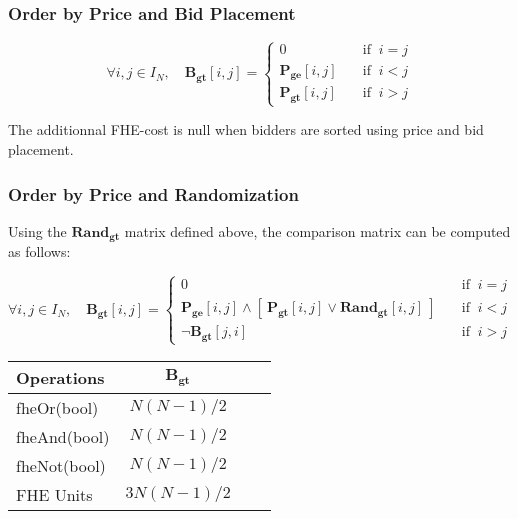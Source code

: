 \subsubsection{Order by Price and Bid Placement}

\begin{equation*}
    \forall i,j \in I_N, \quad \mathbf{B_{gt}}[i, j] = 
    \begin{cases}
        0  \quad &\text{if } \ i = j \\
        \mathbf{P_{ge}}[i, j] \quad &\text{if } \ i < j \\
        \mathbf{P_{gt}}[i, j] \quad &\text{if } \ i > j
    \end{cases}
\end{equation*}

The additionnal FHE-cost is null when bidders are sorted using price and bid placement.

\subsubsection{Order by Price and Randomization}

Using the $\mathbf{Rand_{gt}}$ matrix defined above, the comparison matrix can be computed as follows:

\begin{equation*}
    \forall i,j \in I_N, \quad \mathbf{B_{gt}}[i, j] = 
    \begin{cases}
        0  \quad &\text{if } \ i = j \\
        \mathbf{P_{ge}}[i, j] \land [ \ \mathbf{P_{gt}}[i, j] \lor \mathbf{Rand_{gt}}[i, j] \ ] \quad &\text{if } \ i < j \\
        \neg \mathbf{B_{gt}}[j, i] \quad &\text{if } \ i > j
    \end{cases}
\end{equation*}

\setlength{\parindent}{0pt}
\renewcommand{\arraystretch}{1.5}
\begin{tabular}{ |l|c|c|c| }
    \hline    
    Operations & $\mathbf{B_{gt}}$ \\ 
    \hline
    fheOr(bool)          & $N(N-1)/2$   \\
    fheAnd(bool)         & $N(N-1)/2$   \\
    fheNot(bool)         & $N(N-1)/2$   \\
    \hline
    \hline
    FHE Units           & $3N(N-1)/2$  \\
    \hline
\end{tabular}
